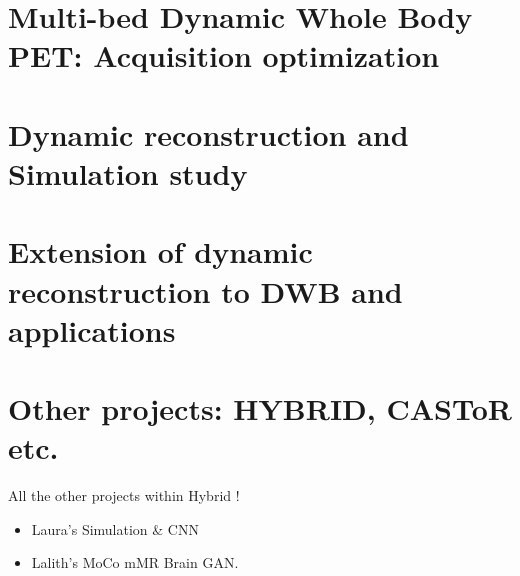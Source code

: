

\chapter{Multi-bed Dynamic Whole Body PET: Acquisition optimization}
\label{Chap3_1:AcquisitionOptimization}
%

\chapter{Dynamic reconstruction and Simulation study}
%

\chapter{Extension of dynamic reconstruction to DWB and applications}


\chapter{Other projects: HYBRID, CASToR etc.}
All the other projects within Hybrid ! \\
\begin{itemize}
    \item Laura's Simulation \& CNN \\
    \item Lalith's MoCo mMR Brain GAN. \\
\end{itemize}

